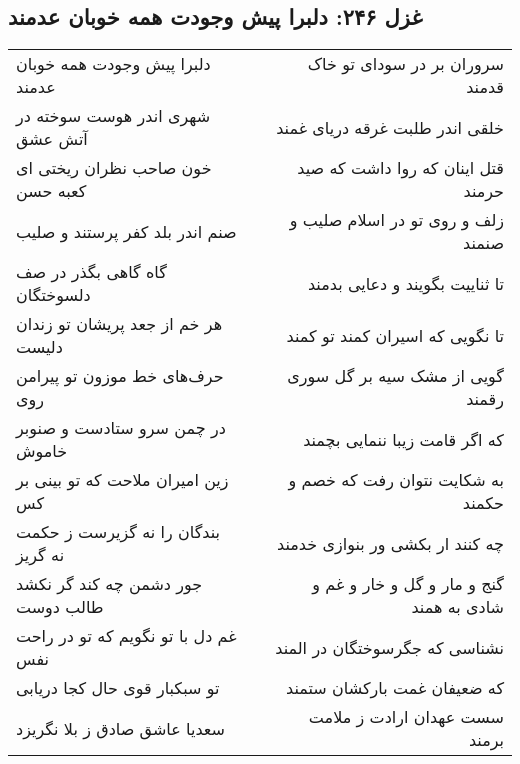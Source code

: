 \begin{center}
\section*{غزل ۲۴۶: دلبرا پیش وجودت همه خوبان عدمند}
\label{sec:246}
\begin{longtable}{l p{0.5cm} r}
دلبرا پیش وجودت همه خوبان عدمند
&&
سروران بر در سودای تو خاک قدمند
\\
شهری اندر هوست سوخته در آتش عشق
&&
خلقی اندر طلبت غرقه دریای غمند
\\
خون صاحب نظران ریختی ای کعبه حسن
&&
قتل اینان که روا داشت که صید حرمند
\\
صنم اندر بلد کفر پرستند و صلیب
&&
زلف و روی تو در اسلام صلیب و صنمند
\\
گاه گاهی بگذر در صف دلسوختگان
&&
تا ثناییت بگویند و دعایی بدمند
\\
هر خم از جعد پریشان تو زندان دلیست
&&
تا نگویی که اسیران کمند تو کمند
\\
حرف‌های خط موزون تو پیرامن روی
&&
گویی از مشک سیه بر گل سوری رقمند
\\
در چمن سرو ستادست و صنوبر خاموش
&&
که اگر قامت زیبا ننمایی بچمند
\\
زین امیران ملاحت که تو بینی بر کس
&&
به شکایت نتوان رفت که خصم و حکمند
\\
بندگان را نه گزیرست ز حکمت نه گریز
&&
چه کنند ار بکشی ور بنوازی خدمند
\\
جور دشمن چه کند گر نکشد طالب دوست
&&
گنج و مار و گل و خار و غم و شادی به همند
\\
غم دل با تو نگویم که تو در راحت نفس
&&
نشناسی که جگرسوختگان در المند
\\
تو سبکبار قوی حال کجا دریابی
&&
که ضعیفان غمت بارکشان ستمند
\\
سعدیا عاشق صادق ز بلا نگریزد
&&
سست عهدان ارادت ز ملامت برمند
\\
\end{longtable}
\end{center}

